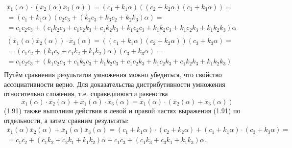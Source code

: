 $\begin{matrix}
  {{{\bar{x}}}_{1}}\left( \alpha  \right)\cdot \left( {{{\bar{x}}}_{2}}\left( \alpha  \right){{{\bar{x}}}_{3}}\left( \alpha  \right) \right)=\left( {{c}_{1}}+{{k}_{1}}\alpha  \right)\left( \left( {{c}_{2}}+{{k}_{2}}\alpha  \right)\left( {{c}_{3}}+{{k}_{3}}\alpha  \right) \right)= \\ 
  =\left( {{c}_{1}}+{{k}_{1}}\alpha  \right)\left( {{c}_{2}}{{c}_{3}}+\left( {{k}_{2}}{{c}_{3}}+{{k}_{3}}{{c}_{2}}+{{k}_{2}}{{k}_{3}} \right)\alpha  \right)= \\ 
  ={{c}_{1}}{{c}_{2}}{{c}_{3}}+\left( {{c}_{1}}{{k}_{2}}{{c}_{3}}+{{c}_{1}}{{c}_{2}}{{k}_{3}}+{{c}_{1}}{{k}_{2}}{{k}_{3}}+{{k}_{1}}{{c}_{2}}{{c}_{3}}+{{k}_{1}}{{k}_{2}}{{c}_{3}}+{{k}_{1}}{{c}_{2}}{{k}_{3}}+{{k}_{1}}{{k}_{2}}{{k}_{3}} \right)\alpha  \\ 
\end{matrix}$ 
$\begin{matrix}
  \left( {{{\bar{x}}}_{1}}\left( \alpha  \right){{{\bar{x}}}_{2}}\left( \alpha  \right) \right)\cdot {{{\bar{x}}}_{3}}\left( \alpha  \right)=\left( \left( {{c}_{1}}+{{k}_{1}}\alpha  \right)\left( {{c}_{2}}+{{k}_{2}}\alpha  \right) \right)\left( {{c}_{3}}+{{k}_{3}}\alpha  \right)= \\ 
  =\left( {{c}_{1}}{{c}_{2}}+\left( {{k}_{1}}{{c}_{2}}+{{c}_{1}}{{k}_{2}}+{{k}_{1}}{{k}_{2}} \right)\alpha  \right)\left( {{c}_{3}}+{{k}_{3}}\alpha  \right)= \\ 
  ={{c}_{1}}{{c}_{2}}{{c}_{3}}+\left( {{k}_{1}}{{c}_{2}}{{c}_{3}}+{{c}_{1}}{{k}_{2}}{{c}_{3}}+{{k}_{1}}{{k}_{2}}{{c}_{3}}+{{c}_{1}}{{c}_{2}}{{k}_{3}}+{{k}_{1}}{{c}_{2}}{{k}_{3}}+{{c}_{1}}{{k}_{2}}{{k}_{3}}+{{k}_{1}}{{k}_{2}}{{k}_{3}} \right) \\ 
\end{matrix}$ 
Путём сравнения результатов умножения можно убедиться, что свойство ассоциативности верно.
Для доказательства дистрибутивности умножения относительно сложения, т.е. справедливости равенства 
	\[{{\bar{x}}_{1}}(\alpha )\cdot {{\bar{x}}_{2}}(\alpha )+{{\bar{x}}_{1}}(\alpha )\cdot {{\bar{x}}_{3}}(\alpha )={{\bar{x}}_{1}}(\alpha )\cdot ({{\bar{x}}_{2}}(\alpha )+{{\bar{x}}_{3}}(\alpha ))\] 	(1.91)
также выполним действия в левой и правой частях выражения (1.91) по отдельности, а затем сравним результаты:
\[\begin{matrix}
  {{{\bar{x}}}_{1}}\left( \alpha  \right){{{\bar{x}}}_{2}}\left( \alpha  \right)+{{{\bar{x}}}_{1}}\left( \alpha  \right){{{\bar{x}}}_{3}}\left( \alpha  \right)=({{c}_{1}}+{{k}_{1}}\alpha )\cdot ({{c}_{2}}+{{k}_{2}}\alpha )+({{c}_{1}}+{{k}_{1}}\alpha )\cdot ({{c}_{3}}+{{k}_{3}}\alpha )= \\ 
  ={{c}_{1}}{{c}_{2}}+({{c}_{1}}{{k}_{2}}+{{c}_{2}}{{k}_{1}}+{{k}_{1}}{{k}_{2}})\alpha +{{c}_{1}}{{c}_{3}}+({{c}_{1}}{{k}_{3}}+{{c}_{3}}{{k}_{1}}+{{k}_{1}}{{k}_{3}})\alpha . \\ 
\end{matrix}\] 

